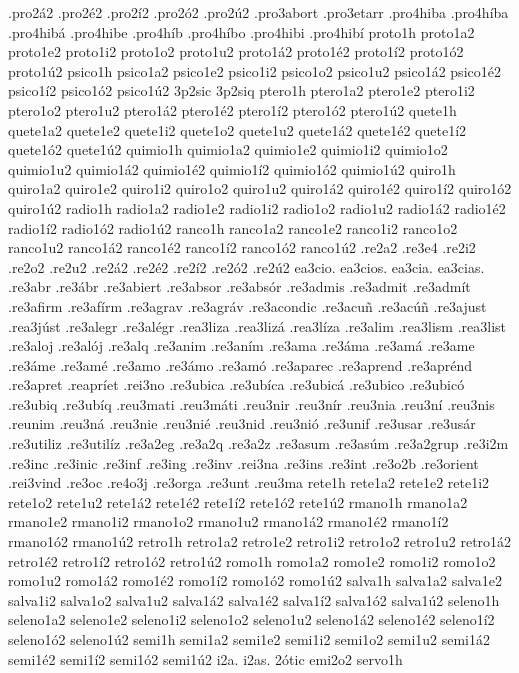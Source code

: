 {.pro2á2 .pro2é2 .pro2í2 .pro2ó2 .pro2ú2
.pro3abort
.pro3etarr
.pro4hiba
.pro4híba
.pro4hibá
.pro4hibe
.pro4híb
.pro4híbo
.pro4hibi
.pro4hibí
proto1h
proto1a2 proto1e2 proto1i2 proto1o2 proto1u2
proto1á2 proto1é2 proto1í2 proto1ó2 proto1ú2
psico1h
psico1a2 psico1e2 psico1i2 psico1o2 psico1u2
psico1á2 psico1é2 psico1í2 psico1ó2 psico1ú2
3p2sic
3p2siq
ptero1h
ptero1a2 ptero1e2 ptero1i2 ptero1o2 ptero1u2
ptero1á2 ptero1é2 ptero1í2 ptero1ó2 ptero1ú2
quete1h
quete1a2 quete1e2 quete1i2 quete1o2 quete1u2
quete1á2 quete1é2 quete1í2 quete1ó2 quete1ú2
quimio1h
quimio1a2 quimio1e2 quimio1i2 quimio1o2 quimio1u2
quimio1á2 quimio1é2 quimio1í2 quimio1ó2 quimio1ú2
quiro1h
quiro1a2 quiro1e2 quiro1i2 quiro1o2 quiro1u2
quiro1á2 quiro1é2 quiro1í2 quiro1ó2 quiro1ú2
radio1h
radio1a2 radio1e2 radio1i2 radio1o2 radio1u2
radio1á2 radio1é2 radio1í2 radio1ó2 radio1ú2
ranco1h
ranco1a2 ranco1e2 ranco1i2 ranco1o2 ranco1u2
ranco1á2 ranco1é2 ranco1í2 ranco1ó2 ranco1ú2
.re2a2
.re3e4
.re2i2
.re2o2
.re2u2
.re2á2
.re2é2
.re2í2
.re2ó2
.re2ú2
ea3cio.
ea3cios.
ea3cia.
ea3cias.
.re3abr
.re3ábr
.re3abiert
.re3absor
.re3absór
.re3admis
.re3admit
.re3admít
.re3afirm
.re3afírm
.re3agrav
.re3agráv
.re3acondic
.re3acuñ
.re3acúñ
.re3ajust
.rea3júst
.re3alegr
.re3alégr
.rea3liza
.rea3lizá
.rea3líza
.re3alim
.rea3lism
.rea3list
.re3aloj
.re3alój
.re3alq
.re3anim
.re3aním
.re3ama
.re3áma
.re3amá
.re3ame
.re3áme
.re3amé
.re3amo
.re3ámo
.re3amó
.re3aparec
.re3aprend
.re3aprénd
.re3apret
.reapríet
.rei3no
.re3ubica
.re3ubíca
.re3ubicá
.re3ubico
.re3ubicó
.re3ubiq
.re3ubíq
.reu3mati
.reu3máti
.reu3nir
.reu3nír
.reu3nia
.reu3ní
.reu3nis
.reunim
.reu3ná
.reu3nie
.reu3nié
.reu3nid
.reu3nió
.re3unif
.re3usar
.re3usár
.re3utiliz
.re3utilíz
.re3a2eg
.re3a2q
.re3a2z
.re3asum
.re3asúm
.re3a2grup
.re3i2m
.re3inc
.re3inic
.re3inf
.re3ing
.re3inv
.rei3na
.re3ins
.re3int
.re3o2b
.re3orient
.rei3vind
.re3oc
.re4o3j
.re3orga
.re3unt
.reu3ma
rete1h
rete1a2 rete1e2 rete1i2 rete1o2 rete1u2
rete1á2 rete1é2 rete1í2 rete1ó2 rete1ú2
rmano1h
rmano1a2 rmano1e2 rmano1i2 rmano1o2 rmano1u2
rmano1á2 rmano1é2 rmano1í2 rmano1ó2 rmano1ú2
retro1h
retro1a2 retro1e2 retro1i2 retro1o2 retro1u2
retro1á2 retro1é2 retro1í2 retro1ó2 retro1ú2
romo1h
romo1a2 romo1e2 romo1i2 romo1o2 romo1u2
romo1á2 romo1é2 romo1í2 romo1ó2 romo1ú2
salva1h
salva1a2 salva1e2 salva1i2 salva1o2 salva1u2
salva1á2 salva1é2 salva1í2 salva1ó2 salva1ú2
seleno1h
seleno1a2 seleno1e2 seleno1i2 seleno1o2 seleno1u2
seleno1á2 seleno1é2 seleno1í2 seleno1ó2 seleno1ú2
semi1h
semi1a2 semi1e2 semi1i2 semi1o2 semi1u2
semi1á2 semi1é2 semi1í2 semi1ó2 semi1ú2
i2a.
i2as.
2ótic
emi2o2
servo1h
}

